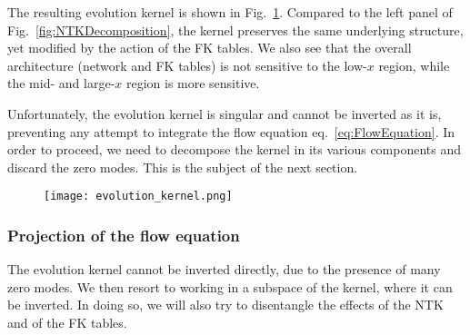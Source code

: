\documentclass[11pt]{article}
\begin{document}
The resulting evolution kernel is shown in Fig.~\ref{fig:EvKernel}.
Compared to the left panel of Fig.~\eqref{fig:NTKDecomposition}, the kernel
preserves the same underlying structure, yet modified by the action of the FK
tables. We also see that the overall architecture (network and FK tables) is not
sensitive to the low-$x$ region, while the mid- and large-$x$ region is more
sensitive.

Unfortunately, the evolution kernel is singular and cannot be inverted as it is,
preventing any attempt to integrate the flow equation eq.~\eqref{eq:FlowEquation}.
In order to proceed, we need to decompose the kernel in its various components and
discard the zero modes. This is the subject of the next section.

\begin{figure}[!t]
  \centering
  \texttt{[image: evolution\_kernel.png]}
  \caption{\small}
  \label{fig:EvKernel}
\end{figure}

\subsubsection*{Projection of the flow equation}
The evolution kernel cannot be inverted directly, due to the presence of many zero
modes. We then resort to working in a subspace of the kernel, where it can be inverted.
In doing so, we will also try to disentangle the effects of the NTK and of the FK tables.
\end{document}
